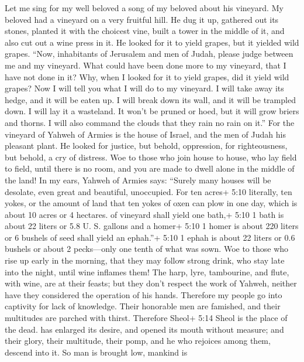  Let me sing for my well beloved a song of my beloved about
his vineyard. My beloved had a vineyard on a very fruitful hill.
 He dug it up, gathered out its stones, planted it with the
choicest vine, built a tower in the middle of it, and also cut out a
wine press in it. He looked for it to yield grapes, but it yielded wild
grapes.  ``Now, inhabitants of Jerusalem and men of Judah,
please judge between me and my vineyard.  What could have
been done more to my vineyard, that I have not done in it? Why, when I
looked for it to yield grapes, did it yield wild grapes? 
Now I will tell you what I will do to my vineyard. I will take away its
hedge, and it will be eaten up. I will break down its wall, and it will
be trampled down.  I will lay it a wasteland. It won't be
pruned or hoed, but it will grow briers and thorns. I will also command
the clouds that they rain no rain on it.''  For the vineyard
of Yahweh of Armies is the house of Israel, and the men of Judah his
pleasant plant. He looked for justice, but behold, oppression, for
righteousness, but behold, a cry of distress.  Woe to those
who join house to house, who lay field to field, until there is no room,
and you are made to dwell alone in the middle of the land! 
In my ears, Yahweh of Armies says: ``Surely many houses will be
desolate, even great and beautiful, unoccupied.  For ten
acres+ 5:10 literally, ten yokes, or the amount of land that ten yokes
of oxen can plow in one day, which is about 10 acres or 4 hectares. of
vineyard shall yield one bath,+ 5:10 1 bath is about 22 liters or 5.8 U.
S. gallons and a homer+ 5:10 1 homer is about 220 liters or 6 bushels of
seed shall yield an ephah.''+ 5:10 1 ephah is about 22 liters or 0.6
bushels or about 2 pecks---only one tenth of what was sown.
 Woe to those who rise up early in the morning, that they
may follow strong drink, who stay late into the night, until wine
inflames them!  The harp, lyre, tambourine, and flute, with
wine, are at their feasts; but they don't respect the work of Yahweh,
neither have they considered the operation of his hands. 
Therefore my people go into captivity for lack of knowledge. Their
honorable men are famished, and their multitudes are parched with
thirst.  Therefore Sheol+ 5:14 Sheol is the place of the
dead. has enlarged its desire, and opened its mouth without measure; and
their glory, their multitude, their pomp, and he who rejoices among
them, descend into it.  So man is brought low, mankind is
